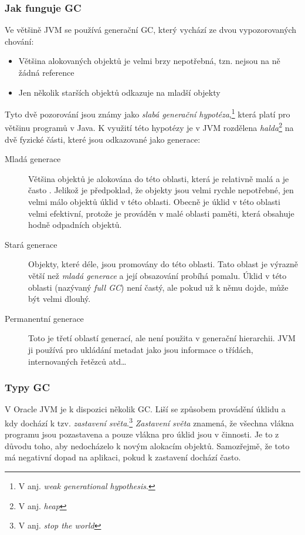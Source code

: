 \subsubsection{Jak funguje GC}
Ve většině JVM se používá generační GC, který vychází ze dvou vypozorovaných chování:
\begin{itemize}
  \item Většina alokovaných objektů je velmi brzy nepotřebná, tzn. nejsou na ně žádná reference
  \item Jen několik starších objektů odkazuje na mladší objekty
\end{itemize}
Tyto dvě pozorování jsou známy jako \emph{slabá generační hypotéza}\cite{hunt2011java},\footnote{V anj. \emph{weak generational hypothesis}.} která platí pro většinu programů v Java.
K využití této hypotézy je v JVM rozdělena \emph{halda}\footnote{V anj. \emph{heap}} na dvě fyzické části, které jsou odkazované jako generace:

\begin{description}
  \item[Mladá generace] Většina objektů je alokována do této oblasti, která je relativně malá a je často .
Jelikož je předpoklad, že objekty jsou velmi rychle nepotřebné, jen velmi málo objektů  úklid v této oblasti.
Obecně je úklid v této oblasti velmi efektivní, protože je prováděn v malé oblasti paměti, která obsahuje hodně odpadních objektů.

  \item[Stará generace] Objekty, které  déle, jsou promovány do této oblasti.
Tato oblast je výrazně větší než \emph{mladá generace} a její obsazování probíhá pomalu.
Úklid v této oblasti (nazývaný \emph{full GC}) není častý, ale pokud už k němu dojde, může být velmi dlouhý.

  \item[Permanentní generace] Toto je třetí oblastí generací, ale není použita v generační hierarchii.
JVM ji používá pro ukládání metadat jako jsou informace o třídách, internovaných řetězců atd\ldots
\end{description}

\subsubsection{Typy GC\label{subsub:gctypes}}

V Oracle JVM je k dispozici několik GC. Liší se způsobem provádění úklidu a kdy dochází k tzv. \emph{zastavení světa}.\footnote{V anj. \emph{stop the world}}
\emph{Zastavení světa} znamená, že všechna vlákna programu jsou pozastavena a pouze vlákna pro úklid jsou v činnosti.
Je to z důvodu toho, aby nedocházelo k novým alokacím objektů.
Samozřejmě, že toto má negativní dopad na aplikaci, pokud k zastavení dochází často.

